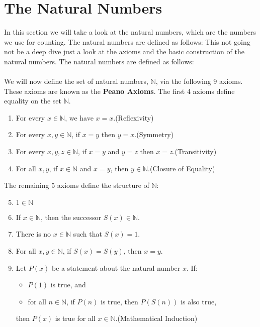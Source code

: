 \section{The Natural Numbers}

In this section we will take a look at the natural numbers, which are the numbers we use for counting. The natural numbers are defined as follows:
This not going not be a deep dive just a look at the axioms and the basic construction of the natural numbers. The natural numbers are defined as follows:
\\\\
We will now define the set of natural numbers, \( \mathbb{N} \), via the following 9 axioms. These axioms are known as the \textbf{Peano Axioms}. The first 4 axioms define equality on the set \( \mathbb{N} \).

\begin{enumerate}[label=\Roman*.]
	\item For every \( x \in \mathbb{N} \), we have \( x = x \).\hfill (Reflexivity)
	\item For every \( x, y \in \mathbb{N} \), if \( x = y \) then \( y = x \).\hfill (Symmetry)
	\item For every \( x, y, z \in \mathbb{N} \), if \( x = y \) and \( y = z \) then \( x = z \).\hfill (Transitivity)
	\item For all \( x, y \), if \( x \in \mathbb{N} \) and \( x = y \), then \( y \in \mathbb{N} \).\hfill (Closure of Equality)
\end{enumerate}

The remaining 5 axioms define the structure of \( \mathbb{N} \):

\begin{enumerate}[label=\Roman*.]
	\setcounter{enumi}{4}
	\item \( 1 \in \mathbb{N} \)
	\item If \( x \in \mathbb{N} \), then the successor \( S(x) \in \mathbb{N} \).
	\item There is no \( x \in \mathbb{N} \) such that \( S(x) = 1 \).
	\item For all \( x, y \in \mathbb{N} \), if \( S(x) = S(y) \), then \( x = y \).
	\item Let \( P(x) \) be a statement about the natural number \( x \). If:
		\begin{itemize}
			\item \( P(1) \) is true, and
			\item for all \( n \in \mathbb{N} \), if \( P(n) \) is true, then \( P(S(n)) \) is also true,
		\end{itemize}
		then \( P(x) \) is true for all \( x \in \mathbb{N} \).\hfill (Mathematical Induction)
\end{enumerate}

